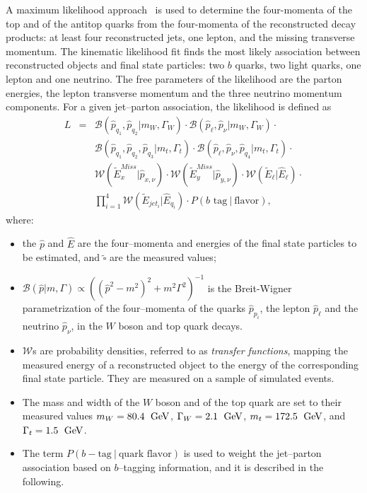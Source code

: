A maximum likelihood approach~\cite{klfitter} is used to determine the
four-momenta of the top and of the antitop quarks from the four-momenta of
the reconstructed decay products: at least four reconstructed jets, one lepton, and the
missing transverse momentum. The kinematic likelihood fit finds the
most likely association between reconstructed objects and \ttbar{} final state particles:
two $b$ quarks, two light quarks, one lepton and one neutrino.
The free parameters of the likelihood are the parton energies, the
lepton transverse momentum and the three neutrino momentum components.
For a given jet--parton association, the likelihood is defined as
\begin{eqnarray}
L & = & \mathcal{B}(\hat{p}_{q_1}, \hat{p}_{q_2} | m_W,  \Gamma_W)
      \cdot \mathcal{B}(\hat{p}_{\ell}, \hat{p}_{\nu} | m_W, \Gamma_W) \cdot \nonumber \\
           &   & \mathcal{B}(\hat{p}_{q_1}, \hat{p}_{q_2},\hat{p}_{q_3} | m_t, \Gamma_t)
                 \cdot \mathcal{B}(\hat{p}_{\ell}, \hat{p}_{\nu},\hat{p}_{q_4} | m_t, \Gamma_t) \cdot \nonumber \\
           &   & \mathcal{W}( \widetilde{E}_{x}^{Miss}| \hat{p}_{x, \nu})
                 \cdot \mathcal{W}(\widetilde{E}_{y}^{Miss} |    \hat{p}_{y, \nu})
                 \cdot \mathcal{W}(\widetilde{E}_{\ell} | \hat{E}_{\ell}) \cdot \nonumber \\
           &   & \prod_{i=1}^4 \mathcal{W}(\widetilde{E}_{jet_i} | \hat{E}_{q_i})
                 \cdot P(\textrm{$b$ tag} ~| ~\textrm{flavor}),
\label{eq:klflikelihood}
\end{eqnarray}
where:
\begin{itemize}
\item the $\hat{p}$ and $\hat{E}$ are the four--momenta and energies
  of the final state particles to be estimated, and
  $\widetilde{\square{}}$ are the measured values; 
\item $\mathcal{B}(\hat{p}|m,\Gamma)\propto((\hat{p}^2-m^2)^2+m^2\Gamma^2)^{-1}$ is
  the Breit-Wigner parametrization of the four--momenta of the quarks
  $\hat{p}_{p_i}$, the lepton $\hat{p}_{\ell}$ and the neutrino
  $\hat{p}_{\nu}$, in the $W$ boson and top quark decays.
\item $\mathcal{W}$s are probability densities, referred to as {\it
    transfer functions}, mapping the measured energy of a
  reconstructed object to the energy of the corresponding final state
  particle. They are measured on a sample of simulated \ttbar{} events.
\item The mass and width of the $W$ boson and of the top quark are set
  to their measured values $m_W = 80.4~\; \mathrm{GeV}{}$, $\Gamma_W = 2.1~\; \mathrm{GeV}{}$, $m_t =
       172.5~\; \mathrm{GeV}{}$, and $\Gamma_t = 1.5~\; \mathrm{GeV}{}$. 
\item The term $P(b-\textrm{tag} ~| ~\textrm{quark flavor})$ is used
  to weight the jet--parton association based on $b$--tagging
  information, and it is described in the following.
\end{itemize}

